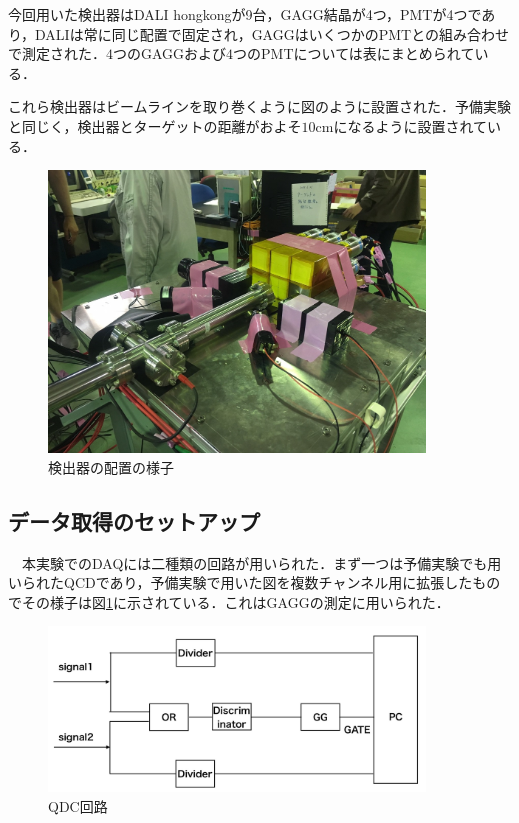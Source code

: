 \documentclass[a4j]{jarticle}
\begin{document}
今回用いた検出器はDALI hongkongが9台，GAGG結晶が4つ，PMTが4つであり，DALIは常に同じ配置で固定され，GAGGはいくつかのPMTとの組み合わせで測定された．$4$つのGAGGおよび$4$つのPMTについては表にまとめられている．

これら検出器はビームラインを取り巻くように図のように設置された．予備実験と同じく，検出器とターゲットの距離がおよそ$10$cmになるように設置されている．
\begin{figure}[htb]
 \centering
 \includegraphics[bb=0 0 1478 1108,width=10cm]{align.jpg}
 \caption{検出器の配置の様子}
\end{figure}
 







\subsection{データ取得のセットアップ}
　本実験でのDAQには二種類の回路が用いられた．まず一つは予備実験でも用いられたQCDであり，予備実験で用いた図を複数チャンネル用に拡張したものでその様子は図\ref{041815_3Sep18}に示されている．これはGAGGの測定に用いられた．
\begin{figure}[htb]
 \centering
 \includegraphics[bb=0 0 2069 911,width=10cm]{QDC2.jpg}
 \caption{QDC回路}
 \label{041815_3Sep18}
\end{figure}
\end{document}
